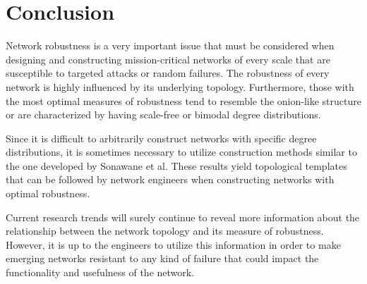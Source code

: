 \documentclass[doc]{apa}%
\begin{document}
\section{Conclusion}
Network robustness is a very important issue that must be considered when designing and constructing mission-critical networks of every scale that are susceptible to targeted attacks or random failures. The robustness of every network is highly influenced by its underlying topology. Furthermore, those with the most optimal measures of robustness tend to resemble the onion-like structure or are characterized by having scale-free or bimodal degree distributions. 

Since it is difficult to arbitrarily construct networks with specific degree distributions, it is sometimes necessary to utilize construction methods similar to the one developed by Sonawane et al. These results yield topological templates that can be followed by network engineers when constructing networks with optimal robustness.

Current research trends will surely continue to reveal more information about the relationship between the network topology and its measure of robustness. However, it is up to the engineers to utilize this information in order to make emerging networks resistant to any kind of failure that could impact the functionality and usefulness of the network. 


\end{document}
